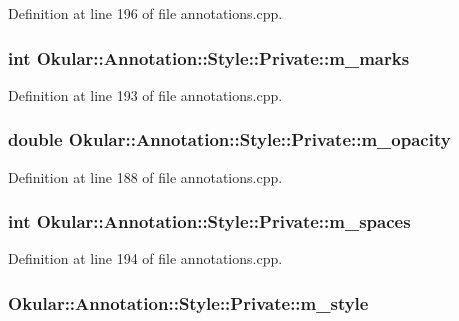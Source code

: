 Definition at line 196 of file annotations.\+cpp.

\hypertarget{classAnnotation_1_1Style_1_1Private_abec0c309c4ac4820d943157c0e897fdb}{
\subsubsection[{m\+\_\+marks}]{\setlength{\rightskip}{0pt plus 5cm}int Okular\+::\+Annotation\+::\+Style\+::\+Private\+::m\+\_\+marks}}\label{classAnnotation_1_1Style_1_1Private_abec0c309c4ac4820d943157c0e897fdb}


Definition at line 193 of file annotations.\+cpp.

\hypertarget{classAnnotation_1_1Style_1_1Private_aa951a265f67ab46849e2b68329258b97}{
\subsubsection[{m\+\_\+opacity}]{\setlength{\rightskip}{0pt plus 5cm}double Okular\+::\+Annotation\+::\+Style\+::\+Private\+::m\+\_\+opacity}}\label{classAnnotation_1_1Style_1_1Private_aa951a265f67ab46849e2b68329258b97}


Definition at line 188 of file annotations.\+cpp.

\hypertarget{classAnnotation_1_1Style_1_1Private_a4a25c7757d7fc2a026d4377f1d47abb4}{
\subsubsection[{m\+\_\+spaces}]{\setlength{\rightskip}{0pt plus 5cm}int Okular\+::\+Annotation\+::\+Style\+::\+Private\+::m\+\_\+spaces}}\label{classAnnotation_1_1Style_1_1Private_a4a25c7757d7fc2a026d4377f1d47abb4}


Definition at line 194 of file annotations.\+cpp.

\hypertarget{classAnnotation_1_1Style_1_1Private_aa10ac5df077d063eeca3cc2b9ab0de6e}{
\subsubsection[{m\+\_\+style}]{ Okular\+::\+Annotation\+::\+Style\+::\+Private\+::m\+\_\+style}}\label{classAnnotation_1_1Style_1_1Private_aa10ac5df077d063eeca3cc2b9ab0de6e}



